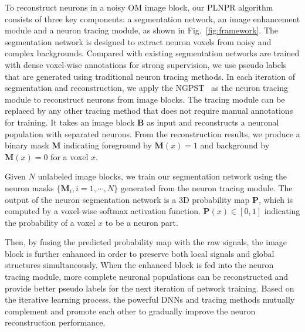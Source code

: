 To reconstruct neurons in a noisy OM image block, our PLNPR algorithm consists of three key components: a segmentation network, an image enhancement module and a neuron tracing module, as shown in Fig.~\ref{fig:framework}. 
%
The segmentation network is designed to extract neuron voxels from noisy and complex backgrounds.
Compared with existing segmentation networks are trained with dense voxel-wise annotations for strong supervision, we use pseudo labels that are generated using traditional neuron tracing methods.
%
In each iteration of segmentation and reconstruction, we apply the NGPST~\cite{Quan2015} as the neuron tracing module to reconstruct neurons from image blocks. 
The tracing module can be replaced by any other tracing method that does not require manual annotations for training.
%
It takes an image block $\mathbf{B}$ as input and reconstructs a neuronal population with separated neurons.
From the reconstruction results, we produce a binary mask $\mathbf{M}$ indicating foreground by $\mathbf{M}(x)=1$ and background by $\mathbf{M}(x)=0$ for a voxel $x$.


Given $N$ unlabeled image blocks, we train our segmentation network using the neuron masks $\{\mathbf{M}_i, i=1,\cdots,N\}$ generated from the neuron tracing module.
%
The output of the neuron segmentation network is a 3D probability map $\mathbf{P}$, which is computed by a voxel-wise softmax activation function. $\mathbf{P}(x)\in [0,1]$ indicating the probability of a voxel $x$ to be a neuron part.


Then, by fusing the predicted probability map with the raw signals, the image block is further enhanced in order to preserve both local signals and global structures simultaneously.
When the enhanced block is fed into the neuron tracing module, more complete neuronal populations can be reconstructed and provide better pseudo labels for the next iteration of network training. 
%
Based on the iterative learning process, the powerful DNNs and tracing methods mutually complement and promote each other to gradually improve the neuron reconstruction performance.



